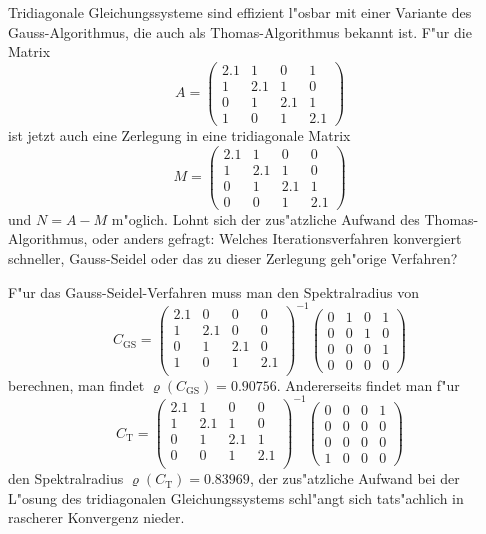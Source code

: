 Tridiagonale Gleichungssysteme sind effizient l"osbar mit einer Variante des
Gauss-Algorithmus, die auch als Thomas-Algorithmus bekannt ist.
F"ur die Matrix 
\[
A=\begin{pmatrix}
2.1&1&0&1\\
1&2.1&1&0\\
0&1&2.1&1\\
1&0&1&2.1
\end{pmatrix}
\]
ist jetzt auch eine Zerlegung in eine tridiagonale Matrix
\[
M=\begin{pmatrix}
2.1&1&0&0\\
1&2.1&1&0\\
0&1&2.1&1\\
0&0&1&2.1
\end{pmatrix}
\]
und $N=A-M$ m"oglich.
Lohnt sich der zus"atzliche Aufwand des Thomas-Algorithmus, oder
anders gefragt:
Welches Iterationsverfahren konvergiert schneller,
Gauss-Seidel oder das zu dieser Zerlegung geh"orige Verfahren?

\begin{loesung}
F"ur das Gauss-Seidel-Verfahren muss man den Spektralradius von
\[
C_{\text{GS}}=
\begin{pmatrix}
2.1&0&0&0\\
1&2.1&0&0\\
0&1&2.1&0\\
1&0&1&2.1\\
\end{pmatrix}^{-1}
\begin{pmatrix}
0&1&0&1\\
0&0&1&0\\
0&0&0&1\\
0&0&0&0
\end{pmatrix}
\]
berechnen, man findet $\varrho(C_{\text{GS}})=0.90756$.
Andererseits findet man f"ur 
\[
C_{\text{T}}=
\begin{pmatrix}
2.1&1&0&0\\
1&2.1&1&0\\
0&1&2.1&1\\
0&0&1&2.1\\
\end{pmatrix}^{-1}
\begin{pmatrix}
0&0&0&1\\
0&0&0&0\\
0&0&0&0\\
1&0&0&0
\end{pmatrix}
\]
den Spektralradius $\varrho(C_{\text{T}})=0.83969$,
der zus"atzliche Aufwand bei der L"osung
des tridiagonalen Gleichungssystems schl"angt sich tats"achlich in
rascherer Konvergenz nieder.
\end{loesung}
